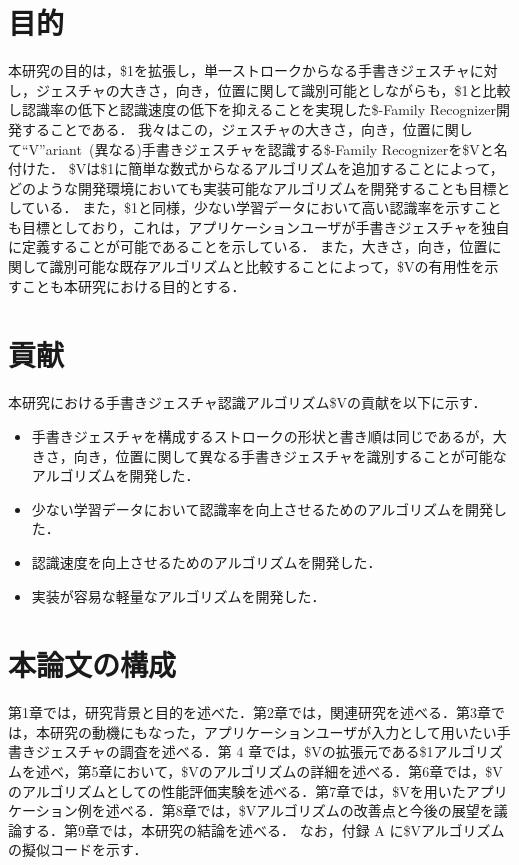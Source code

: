 \section{目的}
本研究の目的は，\$1を拡張し，単一ストロークからなる手書きジェスチャに対し，ジェスチャの大きさ，向き，位置に関して識別可能としながらも，\$1と比較し認識率の低下と認識速度の低下を抑えることを実現した\$-Family Recognizer開発することである．
我々はこの，ジェスチャの大きさ，向き，位置に関して``V''ariant~(異なる)手書きジェスチャを認識する\$-Family Recognizerを\$Vと名付けた．
\$Vは\$1に簡単な数式からなるアルゴリズムを追加することによって，どのような開発環境においても実装可能なアルゴリズムを開発することも目標としている．
また，\$1と同様，少ない学習データにおいて高い認識率を示すことも目標としており，これは，アプリケーションユーザが手書きジェスチャを独自に定義することが可能であることを示している．
また，大きさ，向き，位置に関して識別可能な既存アルゴリズムと比較することによって，\$Vの有用性を示すことも本研究における目的とする．



\section{貢献}
本研究における手書きジェスチャ認識アルゴリズム\$Vの貢献を以下に示す．
\begin{itemize}
\item 手書きジェスチャを構成するストロークの形状と書き順は同じであるが，大きさ，向き，位置に関して異なる手書きジェスチャを識別することが可能なアルゴリズムを開発した．
\item 少ない学習データにおいて認識率を向上させるためのアルゴリズムを開発した．
\item 認識速度を向上させるためのアルゴリズムを開発した．
\item 実装が容易な軽量なアルゴリズムを開発した．
\end{itemize}

\section{本論文の構成}
第1章では，研究背景と目的を述べた．第2章では，関連研究を述べる．第3章では，本研究の動機にもなった，アプリケーションユーザが入力として用いたい手書きジェスチャの調査を述べる．第 4 章では，\$Vの拡張元である\$1アルゴリズムを述べ，第5章において，\$Vのアルゴリズムの詳細を述べる．第6章では，\$Vのアルゴリズムとしての性能評価実験を述べる．第7章では，\$Vを用いたアプリケーション例を述べる．第8章では，\$Vアルゴリズムの改善点と今後の展望を議論する．第9章では，本研究の結論を述べる．
なお，付録 A に\$Vアルゴリズムの擬似コードを示す．

